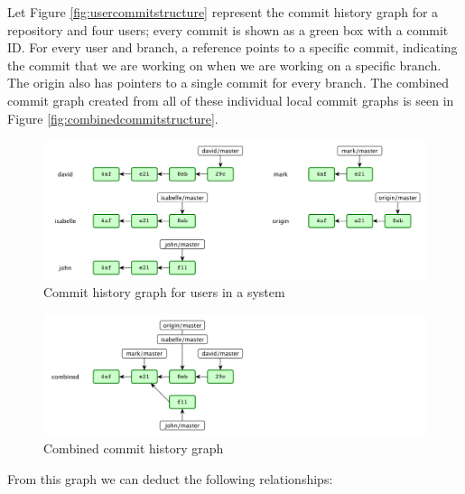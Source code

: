 Let Figure \ref{fig:usercommitstructure} represent the commit history graph for a repository and four users; every commit is shown as a green box with a commit ID. For every user and branch, a reference points to a specific commit, indicating the commit that we are working on when we are working on a specific branch. The origin also has pointers to a single commit for every branch. The combined commit graph created from all of these individual local commit graphs is seen in Figure \ref{fig:combinedcommitstructure}.


\begin{figure}[h!]
  \centering
      \includegraphics[width=1\textwidth]{commitgraph1}
  \caption{Commit history graph for users in a system}
  \label{fig:commitgraph1}
\end{figure}


\begin{figure}[h!]
  \centering
      \includegraphics[width=1\textwidth]{commitgraph2}
  \caption{Combined commit history graph}
  \label{fig:commitgraph2}
\end{figure}

From this graph we can deduct the following relationships:

